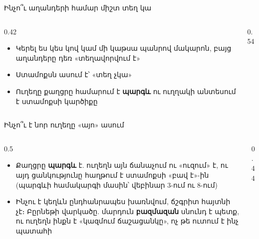 \begin{frame}{Ինչո՞ւ աղանդերի համար միշտ տեղ կա}
  \begin{columns}[c]
    \begin{column}{0.42\textwidth}
      \begin{itemize}
        \item Կերել ես կես կով կամ մի կաթսա պանրով մակարոն, բայց աղանդերը դեռ «տեղավորվում է»
        \item<2-> Ստամոքսն ասում է՝ «տեղ չկա»
        \item<3-> Ուղեղը քաղցրը համարում է \textbf{պարգև} ու ուղղակի անտեսում է ստամոքսի կարծիքը
      \end{itemize}
    \end{column}
    \begin{column}{0.54\textwidth}
      \centering
    \end{column}
  \end{columns}
\end{frame}

\begin{frame}{Ինչո՞ւ է նոր ուղեղը «այո» ասում}
  \begin{columns}[T]
    \begin{column}{0.5\textwidth}
      \begin{itemize}
        \item<1-> Քաղցրը \textbf{պարգև} է. ուղեղն այն ճանաչում ու «ուզում» է, ու այդ ցանկությունը հաղթում է ստամոքսի «բավ է»-ին {\small(պարգևի համակարգի մասին՝ վեբինար 3-ում ու 8-ում)}
        \item<2-> Ինչու է կեղևն ընդհանրապես խառնվում, ճշգրիտ հայտնի չէ։ Բըրնեթի վարկածը. մարդուն \textbf{բազմազան} սնունդ է պետք, ու ուղեղն ինքն է «կազմում ճաշացանկը», ոչ թե ուտում է ինչ պատահի
      \end{itemize}
    \end{column}
    \begin{column}{0.44\textwidth}
    \end{column}
  \end{columns}
\end{frame}

